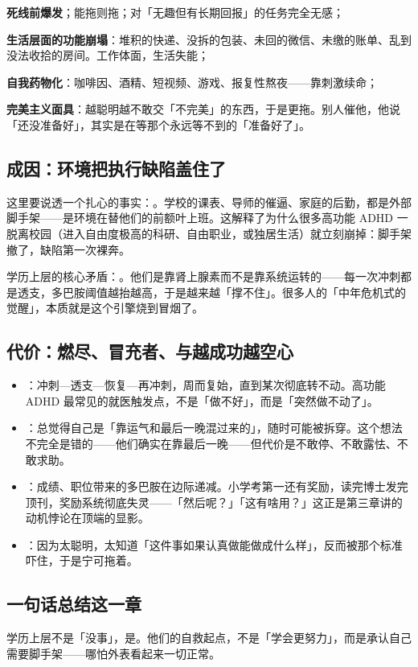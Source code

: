 \begin{checklist}
  \item \textbf{死线前爆发}；能拖则拖；对「无趣但有长期回报」的任务完全无感；
  \item \textbf{生活层面的功能崩塌}：堆积的快递、没拆的包装、未回的微信、未缴的账单、乱到没法收拾的房间。工作体面，生活失能；
  \item \textbf{自我药物化}：咖啡因、酒精、短视频、游戏、报复性熬夜——靠刺激续命；
  \item \textbf{完美主义面具}：越聪明越不敢交「不完美」的东西，于是更拖。别人催他，他说「还没准备好」，其实是在等那个永远等不到的「准备好了」。
\end{checklist}

\subsection{成因：环境把执行缺陷盖住了}

这里要说透一个扎心的事实：。学校的课表、导师的催逼、家庭的后勤，都是外部脚手架——是环境在替他们的前额叶上班。这解释了为什么很多高功能 ADHD 一脱离校园（进入自由度极高的科研、自由职业，或独居生活）就立刻崩掉：脚手架撤了，缺陷第一次裸奔。

\begin{insight}
学历上层的核心矛盾：。他们是靠肾上腺素而不是靠系统运转的——每一次冲刺都是透支，多巴胺阈值越抬越高，于是越来越「撑不住」。很多人的「中年危机式的觉醒」，本质就是这个引擎烧到冒烟了。
\end{insight}

\subsection{代价：燃尽、冒充者、与越成功越空心}

\begin{itemize}
  \item {}：冲刺—透支—恢复—再冲刺，周而复始，直到某次彻底转不动。高功能 ADHD 最常见的就医触发点，不是「做不好」，而是「突然做不动了」。
  \item {}：总觉得自己是「靠运气和最后一晚混过来的」，随时可能被拆穿。这个想法不完全是错的——他们确实在靠最后一晚——但代价是不敢停、不敢露怯、不敢求助。
  \item {}：成绩、职位带来的多巴胺在边际递减。小学考第一还有奖励，读完博士发完顶刊，奖励系统彻底失灵——「然后呢？」「这有啥用？」这正是第三章讲的动机悖论在顶端的显影。
  \item {}：因为太聪明，太知道「这件事如果认真做能做成什么样」，反而被那个标准吓住，于是宁可拖着。
\end{itemize}

\subsection{一句话总结这一章}

学历上层不是「没事」，是。他们的自救起点，不是「学会更努力」，而是承认自己需要脚手架——哪怕外表看起来一切正常。
